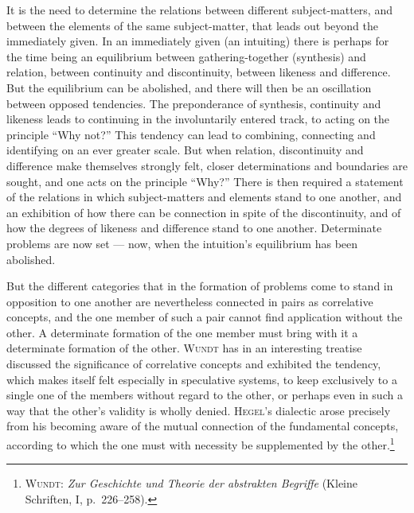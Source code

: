 \documentclass[12pt]{book}
\newcommand{\opage}[1]{\marginnote{\footnotesize\textit{[#1]}}}
\begin{document}
It is the need to determine the relations between different subject-matters, and
between the elements of the same subject-matter, that leads out beyond the
immediately given. In an immediately given (an intuiting) there is perhaps for
the time being an equilibrium between gathering-together (synthesis) and
relation, between continuity and discontinuity, between likeness and difference.
But the equilibrium can be abolished, and there will then be an oscillation
\opage{30}between opposed tendencies. The preponderance of synthesis, continuity and
likeness leads to continuing in the involuntarily entered track, to acting on the
principle ``Why not?'' This tendency can lead to combining, connecting and
identifying on an ever greater scale. But when relation, discontinuity and
difference make themselves strongly felt, closer determinations and boundaries
are sought, and one acts on the principle ``Why?'' There is then required a
statement of the relations in which subject-matters and elements stand to one
another, and an exhibition of how there can be connection in spite of the
discontinuity, and of how the degrees of likeness and difference stand to one
another. Determinate problems are now set --- now, when the intuition's
equilibrium has been abolished.

But the different categories that in the formation of problems come to stand in
opposition to one another are nevertheless connected in pairs as correlative
concepts, and the one member of such a pair cannot find application without the
other. A determinate formation of the one member must bring with it a determinate
formation of the other. \textsc{Wundt} has in an interesting treatise discussed
the significance of correlative concepts and exhibited the tendency, which makes
itself felt especially in speculative systems, to keep exclusively to a single
one of the members without regard to the other, or perhaps even in such a way
that the other's validity is wholly denied. \textsc{Hegel}'s dialectic arose
precisely from his becoming aware of the mutual connection of the fundamental
concepts, according to which the one must with necessity be supplemented by the
other.\footnote{\textsc{Wundt}: \textit{Zur Geschichte und Theorie der
abstrakten Begriffe} (Kleine Schriften, I, p.\ 226--258).}
\end{document}
